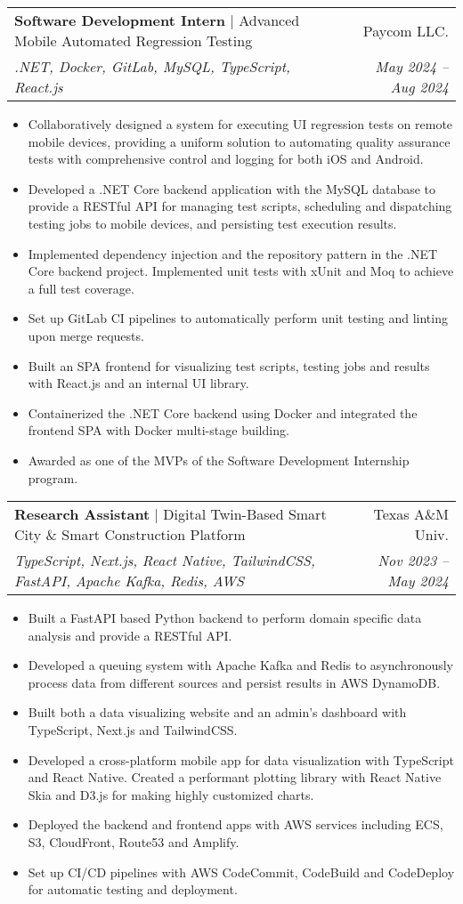 \documentclass[letterpaper,11pt]{article}
\makeatletter
\newcommand{\mySecondaryItem}[1]{
  \item\raggedright\small{#1\vspace{-.5pt}}
}
\newcommand{\twoRowSubHeading}[5]{
  \item
  \begin{tabular*}{0.97\textwidth}{l@{\extracolsep{\fill}}r}
    \textbf{#1} | {#2} & {#3} \\
    \small{\textit{#4}} & \textit{\small{#5}} \\
  \end{tabular*}\vspace{-5pt}
}
\newcommand{\itemListStart}{\begin{itemize}[leftmargin=*]}
\newcommand{\itemListEnd}{\end{itemize}\vspace{-5pt}}
\makeatother
\begin{document}
\twoRowSubHeading
{Software Development Intern}
{Advanced Mobile Automated Regression Testing}
{Paycom LLC.}
{.NET, Docker, GitLab, MySQL, TypeScript, React.js}
{May 2024 -- Aug 2024}
\itemListStart
\mySecondaryItem{
  Collaboratively designed a system for executing UI regression tests on remote mobile devices, providing a uniform solution to automating quality assurance tests with comprehensive control and logging for both iOS and Android.
}
\mySecondaryItem{
  Developed a .NET Core backend application with the MySQL database to provide a RESTful API for managing test scripts, scheduling and dispatching testing jobs to mobile devices, and persisting test execution results.
}
\mySecondaryItem{
  Implemented dependency injection and the repository pattern in the .NET Core backend project. Implemented unit tests with xUnit and Moq to achieve a full test coverage.
}
\mySecondaryItem{
  Set up GitLab CI pipelines to automatically perform unit testing and linting upon merge requests.
}
\mySecondaryItem{
  Built an SPA frontend for visualizing test scripts, testing jobs and results with React.js and an internal UI library.
}
\mySecondaryItem{
  Containerized the .NET Core backend using Docker and integrated the frontend SPA with Docker multi-stage building.
}
\mySecondaryItem{
  Awarded as one of the MVPs of the Software Development Internship program. 
}
\itemListEnd

\twoRowSubHeading
{Research Assistant}
{Digital Twin-Based Smart City \& Smart Construction Platform
}
{Texas A\&M Univ.}
{TypeScript, Next.js, React Native, TailwindCSS, FastAPI, Apache Kafka, Redis, AWS}
{Nov 2023 -- May 2024}
\itemListStart
\mySecondaryItem{
  Built a FastAPI based Python backend to perform domain specific data analysis and provide a RESTful API.
}
\mySecondaryItem{
  Developed a queuing system with Apache Kafka and Redis to asynchronously process data from different sources and persist results in AWS DynamoDB.
}
\mySecondaryItem{
  Built both a data visualizing website and an admin's dashboard with TypeScript, Next.js and TailwindCSS.
}
\mySecondaryItem{
  Developed a cross-platform mobile app for data visualization with TypeScript and React Native. Created a performant plotting library with React Native Skia and D3.js for making highly customized charts.
}
\mySecondaryItem{
  Deployed the backend and frontend apps with AWS services including ECS, S3, CloudFront, Route53 and Amplify.
}
\mySecondaryItem{
  Set up CI/CD pipelines with AWS CodeCommit, CodeBuild and CodeDeploy for automatic testing and deployment.
}
\itemListEnd
\end{document}

